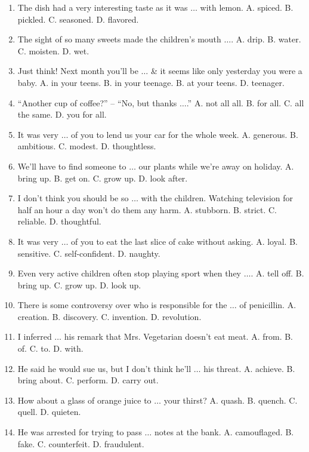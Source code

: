 \documentclass{article}
\numberwithin{equation}{section}
\begin{document}
\begin{enumerate}[leftmargin=8mm]
	\item The dish had a very interesting taste as it was $\ldots$ with lemon. {\sf A.} spiced. {\sf B.} pickled. {\sf C.} seasoned. {\sf D.} flavored.
	\item The sight of so many sweets made the children's mouth $\ldots$. {\sf A.} drip. {\sf B.} water. {\sf C.} moisten. {\sf D.} wet.
	\item Just think! Next month you'll be $\ldots$ \& it seems like only yesterday you were a baby. {\sf A.} in your teens. {\sf B.} in your teenage. {\sf B.} at your teens. {\sf D.} teenager.
	\item ``Another cup of coffee?'' -- ``No, but thanks $\ldots$.'' {\sf A.} not all all. {\sf B.} for all. {\sf C.} all the same. {\sf D.} you for all.
	\item It was very $\ldots$ of you to lend us your car for the whole week. {\sf A.} generous. {\sf B.} ambitious. {\sf C.} modest. {\sf D.} thoughtless.
	\item We'll have to find someone to $\ldots$ our plants while we're away on holiday. {\sf A.} bring up. {\sf B.} get on. {\sf C.} grow up. {\sf D.} look after.
	\item I don't think you should be so $\ldots$ with the children. Watching television for half an hour a day won't do them any harm. {\sf A.} stubborn. {\sf B.} strict. {\sf C.} reliable. {\sf D.} thoughtful.
	\item It was very $\ldots$ of you to eat the last slice of cake without asking. {\sf A.} loyal. {\sf B.} sensitive. {\sf C.} self-confident. {\sf D.} naughty.
	\item Even very active children often stop playing sport when they $\ldots$. {\sf A.} tell off. {\sf B.} bring up. {\sf C.} grow up. {\sf D.} look up.
	\item There is some controversy over who is responsible for the $\ldots$ of penicillin. {\sf A.} creation. {\sf B.} discovery. {\sf C.} invention. {\sf D.} revolution.
	\item I inferred $\ldots$ his remark that Mrs. Vegetarian doesn't eat meat. {\sf A.} from. {\sf B.} of. {\sf C.} to. {\sf D.} with.
	\item He said he would sue us, but I don't think he'll $\ldots$ his threat. {\sf A.} achieve. {\sf B.} bring about. {\sf C.} perform. {\sf D.} carry out.
	\item How about a glass of orange juice to $\ldots$ your thirst? {\sf A.} quash. {\sf B.} quench. {\sf C.} quell. {\sf D.} quieten.
	\item He was arrested for trying to pass $\ldots$ notes at the bank. {\sf A.} camouflaged. {\sf B.} fake. {\sf C.} counterfeit. {\sf D.} fraudulent.

\end{enumerate}
\end{document}

